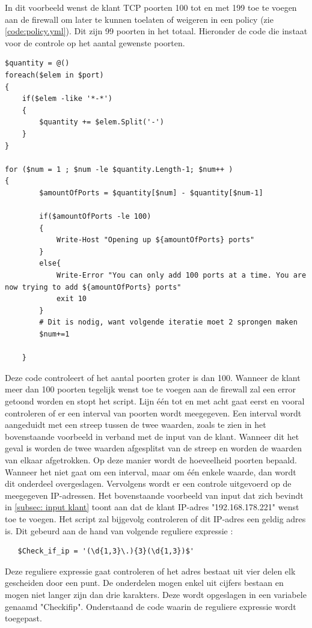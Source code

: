 In dit voorbeeld wenst de klant TCP poorten 100 tot en met 199 toe te voegen aan de firewall om later te kunnen toelaten of weigeren in een policy (zie \ref{code:policy.yml}). Dit zijn 99 poorten in het totaal. Hieronder de code die instaat voor de controle op het aantal gewenste poorten. 
\begin{lstlisting}[caption={main.ps1, controle aantal poorten}]
$quantity = @()
foreach($elem in $port)
{
    if($elem -like '*-*')
    {
        $quantity += $elem.Split('-')
    }
}

for ($num = 1 ; $num -le $quantity.Length-1; $num++ )
{
        $amountOfPorts = $quantity[$num] - $quantity[$num-1]

        if($amountOfPorts -le 100)
        {
            Write-Host "Opening up ${amountOfPorts} ports"
        }
        else{
            Write-Error "You can only add 100 ports at a time. You are now trying to add ${amountOfPorts} ports"
            exit 10
        }
        # Dit is nodig, want volgende iteratie moet 2 sprongen maken
        $num+=1
        
    }
\end{lstlisting}
Deze code controleert of het aantal poorten groter is dan 100. Wanneer de klant meer dan 100 poorten tegelijk wenst toe te voegen aan de firewall zal een error getoond worden en stopt het script. Lijn één tot en met acht gaat eerst en vooral controleren of er een interval van poorten wordt meegegeven. Een interval wordt aangeduidt met een streep tussen de twee waarden, zoals te zien in het bovenstaande voorbeeld in verband met de input van de klant. Wanneer dit het geval is worden de twee waarden afgesplitst van de streep en worden de waarden van elkaar afgetrokken. Op deze manier wordt de hoeveelheid poorten bepaald. Wanneer het niet gaat om een interval, maar om één enkele waarde, dan wordt dit onderdeel overgeslagen. 
\newline
Vervolgens wordt er een controle uitgevoerd op de meegegeven IP-adressen. Het bovenstaande voorbeeld van input dat zich bevindt in \ref{subsec: input klant} toont aan dat de klant IP-adres "192.168.178.221" wenst toe te voegen. Het script zal bijgevolg controleren of dit IP-adres een geldig adres is. Dit gebeurd aan de hand van volgende reguliere expressie :
\begin{lstlisting}
   $Check_if_ip = '(\d{1,3}\.){3}(\d{1,3})$'
\end{lstlisting}
Deze reguliere expressie gaat controleren of het adres bestaat uit vier delen elk gescheiden door een punt. De onderdelen mogen enkel uit cijfers bestaan en mogen niet langer zijn dan drie karakters. Deze wordt opgeslagen in een variabele genaamd "Check\textunderscore if\textunderscore ip". Onderstaand de code waarin de reguliere expressie wordt toegepast. 
